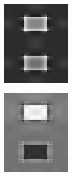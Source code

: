 \documentclass[journal,onecolumn]{IEEEtran}
\begin{document}
{\begin{figure}[H]
\begin{subfigure}[b]{0.2\textwidth}
            \includegraphics[width=.85\linewidth, frame]{test-crisp-dwt-1-ld}
            \caption{}
            \label{fig:test-crisp-dwt-1-ld}
    \end{subfigure}%
    \begin{subfigure}[b]{0.2\textwidth}
            \centering
            \includegraphics[width=.85\linewidth, frame]{test-crisp-dwt-2-ld}

\end{subfigure}
\end{figure}}
\end{document}
